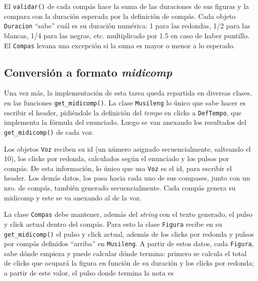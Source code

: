 \documentclass{article}
\begin{document}
El \texttt{validar()} de cada compás hace la suma de las duraciones de sus figuras y la compara con
la duración esperada por la definición de compás.  Cada objeto \texttt{Duracion} ``sabe'' cuál es su
duración numérica: 1 para las redondas, 1/2 para las blancas, 1/4 para las negras, etc.
multiplicado por 1.5 en caso de haber puntillo.  El \texttt{Compas} levana una excepción si la suma
es mayor o menor a lo esperado.


\subsection*{Conversión a formato \emph{midicomp}}
Una vez más, la implementación de esta tarea queda repartida en diversas clases, en las funciones
\texttt{get\_midicomp()}.  La clase \texttt{Musileng} lo único que sabe hacer es escribir el header,
pidiéndole la definición del \emph{tempo} en clicks a \texttt{DefTempo}, que implementa la fórmula
del enunciado.  Luego se van anexando los resultados del \texttt{get\_midicomp()} de cada voz.

Los objetos \texttt{Voz} reciben su id (un número asignado secuencialmente, salteando el
10\footnotemark[2]), los clicks por redonda, calculados según el enunciado y los pulsos por compás.
De esta información, lo único que usa \texttt{Voz} es el id, para escribir el header.  Los demás
datos, los pasa hacia cada uno de sus compases, junto con un nro. de compás, también generado
secuencialmente.  Cada compás genera su midicomp y este se va anexando al de la voz.


La clase \texttt{Compas} debe mantener, además del \emph{string} con el texto generado, el pulso y
click actual dentro del compás.  Para esto la clase \texttt{Figura} recibe en su
\texttt{get\_midicomp()} el pulso y click actual, además de los clicks por redonda y pulsos por
compás definidos ``arriba'' en \texttt{Musileng}.  A partir de estos datos, cada \texttt{Figura},
sabe dónde empieza y puede calcular dónde termina: primero se calcula el total de clicks que ocupará
la figura en función de su duración y los clicks por redonda; a partir de este valor, el pulso donde
termina la nota es 
\end{document}
